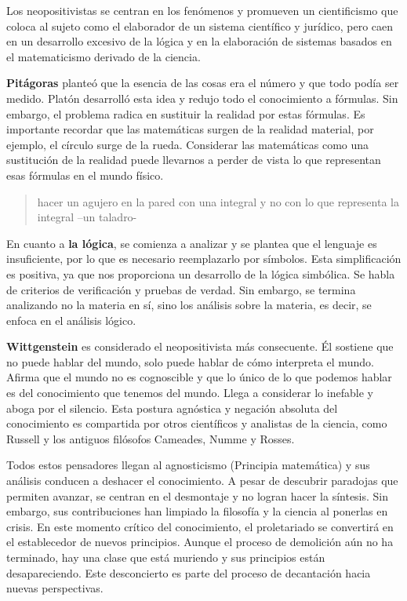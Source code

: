 \documentclass[
  jou,
  floatsintext,
  longtable,
  a4paper,
  nolmodern,
  notxfonts,
  notimes,
  12pt,
  colorlinks=true,linkcolor=blue,citecolor=blue,urlcolor=blue]{apa7}
\begin{document}
Los neopositivistas se centran en los fenómenos y promueven un
cientificismo que coloca al sujeto como el elaborador de un sistema
científico y jurídico, pero caen en un desarrollo excesivo de la lógica
y en la elaboración de sistemas basados en el matematicismo derivado de
la ciencia.

\textbf{Pitágoras} planteó que la esencia de las cosas era el número y
que todo podía ser medido. Platón desarrolló esta idea y redujo todo el
conocimiento a fórmulas. Sin embargo, el problema radica en sustituir la
realidad por estas fórmulas. Es importante recordar que las matemáticas
surgen de la realidad material, por ejemplo, el círculo surge de la
rueda. Considerar las matemáticas como una sustitución de la realidad
puede llevarnos a perder de vista lo que representan esas fórmulas en el
mundo físico.

\begin{quote}
hacer un agujero en la pared con una integral y no con lo que representa
la integral --un taladro-
\end{quote}

En cuanto a \textbf{la lógica}, se comienza a analizar y se plantea que
el lenguaje es insuficiente, por lo que es necesario reemplazarlo por
símbolos. Esta simplificación es positiva, ya que nos proporciona un
desarrollo de la lógica simbólica. Se habla de criterios de verificación
y pruebas de verdad. Sin embargo, se termina analizando no la materia en
sí, sino los análisis sobre la materia, es decir, se enfoca en el
análisis lógico.

\textbf{Wittgenstein} es considerado el neopositivista más consecuente.
Él sostiene que no puede hablar del mundo, solo puede hablar de cómo
interpreta el mundo. Afirma que el mundo no es cognoscible y que lo
único de lo que podemos hablar es del conocimiento que tenemos del
mundo. Llega a considerar lo inefable y aboga por el silencio. Esta
postura agnóstica y negación absoluta del conocimiento es compartida por
otros científicos y analistas de la ciencia, como Russell y los antiguos
filósofos Cameades, Numme y Rosses.

Todos estos pensadores llegan al agnosticismo (Principia matemática) y
sus análisis conducen a deshacer el conocimiento. A pesar de descubrir
paradojas que permiten avanzar, se centran en el desmontaje y no logran
hacer la síntesis. Sin embargo, sus contribuciones han limpiado la
filosofía y la ciencia al ponerlas en crisis. En este momento crítico
del conocimiento, el proletariado se convertirá en el establecedor de
nuevos principios. Aunque el proceso de demolición aún no ha terminado,
hay una clase que está muriendo y sus principios están desapareciendo.
Este desconcierto es parte del proceso de decantación hacia nuevas
perspectivas.
\end{document}
